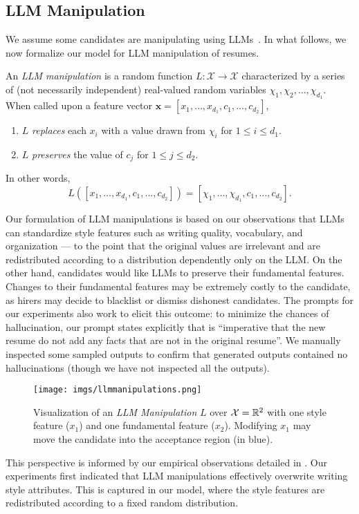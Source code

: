 \subsection{LLM Manipulation}
    We assume some candidates are manipulating using  LLMs~\citep{Verma_Renjarla_2024, ats_hack}. In what follows, we now formalize our model for LLM manipulation of resumes. 

    \begin{definition}
        \label{def: formulation of LLM}
    
        An \emph{LLM manipulation} is a random function \(L:\mathcal X \rightarrow \mathcal X\) characterized by a series of (not necessarily independent) real-valued random variables \(\chi_1, \chi_2, \dots, \chi_{d_1}\). When called upon a feature vector \(\bm{x} = [x_1, \dots, x_{d_1}, c_1, \dots, c_{d_2}]\),
        \begin{enumerate}
            \item \(L\) \emph{replaces} each \(x_i\) with a value drawn from \(\chi_i\) for \(1 \leq i \leq d_1\).
            \item \(L\) \emph{preserves} the value of \(c_j\) for \(1 \leq j \leq d_2\).
        \end{enumerate}
        In other words,
        \[L([x_1, \dots, x_{d_1}, c_1, \dots, c_{d_2}]) = 
        [\chi_1, \dots, \chi_{d_1}, c_1, \dots, c_{d_2}].
        \] 
    \end{definition}
    Our formulation of LLM manipulations is based on our observations that LLMs can standardize style features such as writing quality, vocabulary, and organization --- to the point that the original values are irrelevant and are redistributed according to a distribution dependently only on the LLM. On the other hand, candidates would like LLMs to preserve their fundamental features. Changes to their fundamental features may be extremely costly to the candidate, as hirers may decide to blacklist or dismiss dishonest candidates. The prompts for our experiments also work to elicit this outcome: to minimize the chances of hallucination, our prompt states explicitly that is ``imperative that the new resume do not add any facts that are not in the original resume''. We manually inspected some sampled outputs to confirm that generated outputs contained no hallucinations (though we have not inspected all the outputs).
    \begin{figure}[t]{}
        \centering
        \texttt{[image: imgs/llmmanipulations.png]}
        \caption{Visualization of an \textit{LLM Manipulation} \(L\) over \(\mathcal{X} = \mathbb{R}^2\) with one style feature ($x_1$) and one fundamental feature ($x_2$). Modifying $x_1$ may move the candidate into the acceptance region (in blue).}
    \end{figure}
    This perspective is informed by our empirical observations detailed in . Our experiments first indicated that LLM manipulations effectively overwrite writing style attributes. This is captured in our model, where the style features are redistributed according to a fixed random distribution. 

